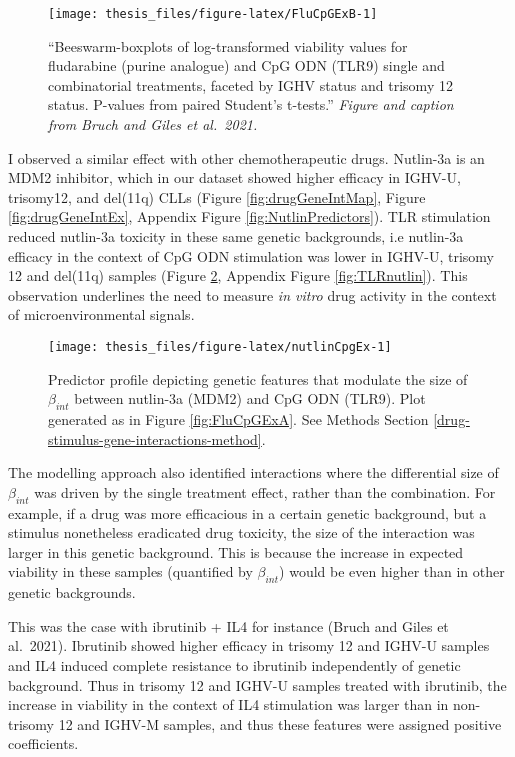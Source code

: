 \documentclass[11pt, a4paper, twosided]{book}
\begin{document}
\begin{figure}

{\centering \texttt{[image: thesis\_files/figure-latex/FluCpGExB-1]} 

}

\caption{``Beeswarm-boxplots of log-transformed viability values for fludarabine (purine analogue) and CpG ODN (TLR9) single and combinatorial treatments, faceted by IGHV status and trisomy 12 status. P-values from paired Student's t-tests.'' \emph{Figure and caption from Bruch and Giles et al.~2021.}}\label{fig:FluCpGExB}
\end{figure}
I observed a similar effect with other chemotherapeutic drugs. Nutlin-3a is an MDM2 inhibitor, which in our dataset showed higher efficacy in IGHV-U, trisomy12, and del(11q) CLLs (Figure \ref{fig:drugGeneIntMap}, Figure \ref{fig:drugGeneIntEx}, Appendix Figure \ref{fig:NutlinPredictors}). TLR stimulation reduced nutlin-3a toxicity in these same genetic backgrounds, i.e nutlin-3a efficacy in the context of CpG ODN stimulation was lower in IGHV-U, trisomy 12 and del(11q) samples (Figure \ref{fig:nutlinCpgEx}, Appendix Figure \ref{fig:TLRnutlin}). This observation underlines the need to measure \emph{in vitro} drug activity in the context of microenvironmental signals.


\begin{figure}

{\centering \texttt{[image: thesis\_files/figure-latex/nutlinCpgEx-1]} 

}

\caption{Predictor profile depicting genetic features that modulate the size of \(\beta_{int}\) between nutlin-3a (MDM2) and CpG ODN (TLR9). Plot generated as in Figure \ref{fig:FluCpGExA}. See Methods Section \ref{drug-stimulus-gene-interactions-method}.}\label{fig:nutlinCpgEx}
\end{figure}
The modelling approach also identified interactions where the differential size of \(\beta_{int}\) was driven by the single treatment effect, rather than the combination. For example, if a drug was more efficacious in a certain genetic background, but a stimulus nonetheless eradicated drug toxicity, the size of the interaction was larger in this genetic background. This is because the increase in expected viability in these samples (quantified by \(\beta_{int}\)) would be even higher than in other genetic backgrounds.

This was the case with ibrutinib + IL4 for instance (Bruch and Giles et al.~2021). Ibrutinib showed higher efficacy in trisomy 12 and IGHV-U samples and IL4 induced complete resistance to ibrutinib independently of genetic background. Thus in trisomy 12 and IGHV-U samples treated with ibrutinib, the increase in viability in the context of IL4 stimulation was larger than in non-trisomy 12 and IGHV-M samples, and thus these features were assigned positive coefficients.
\end{document}
